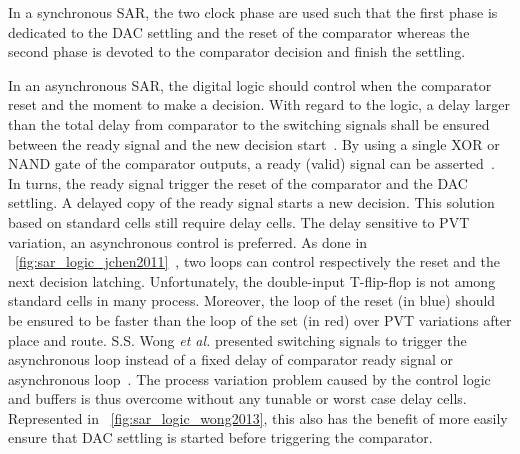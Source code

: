 In a synchronous SAR, the two clock phase are used such that the first phase is dedicated to the DAC settling and the reset of the comparator whereas the second phase is devoted to the comparator decision and finish the settling.

In an asynchronous SAR, the digital logic should control when the comparator reset and the moment to make a decision. With regard to the logic, a delay larger than the total delay from comparator to the switching signals shall be ensured between the ready signal and the new decision start~\cite{Brenna2014}. By using a single XOR or NAND gate of the comparator outputs, a ready (valid) signal can be asserted~\cite{Brenna2014, Sekimoto2011, Zhu2015,Shen2018}. In turns, the ready signal trigger the reset of the comparator and the DAC settling. A delayed copy of the ready signal starts a new decision. This solution based on standard cells still require delay cells. The delay sensitive to PVT variation, an asynchronous control is preferred. As done in \figurename~\ref{fig:sar_logic_jchen2011}~\cite{JChen2011}, two loops can control respectively the reset and the next decision latching. Unfortunately, the double-input T-flip-flop is not among standard cells in many process. Moreover, the loop of the reset (in blue) should be ensured to be faster than the loop of the set (in red) over PVT variations after place and route. S.S. Wong \textit{et al.} presented switching signals to trigger the asynchronous loop instead of a fixed delay of comparator ready signal or asynchronous loop~\cite{Wong2013}. The process variation problem caused by the control logic and buffers is thus overcome without any tunable or worst case delay cells. Represented in \figurename~\ref{fig:sar_logic_wong2013}, this also has the benefit of more easily ensure that DAC settling is started before triggering the comparator.

